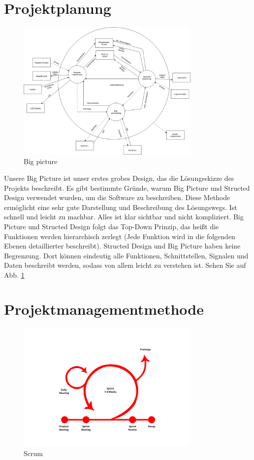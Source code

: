 \section{Projektplanung}
\begin{figure}[H]
	\includegraphics[width=0.8\textwidth]{./figures/Big_Picture.jpg}
	\caption{Big picture}
	\label{fig:bigpicture}
\end{figure}
Unsere Big Picture ist unser erstes grobes Design, das die Lösungsskizze des Projekts beschreibt. Es gibt bestimmte Gründe, warum Big Picture und Structed Design verwendet wurden, um die Software zu beschreiben. Diese Methode ermöglicht eine sehr gute Darstellung und Beschreibung des Lösungswegs. Ist schnell und leicht zu machbar. Alles ist klar sichtbar und nicht kompliziert. Big Picture und Structed Design folgt das Top-Down Prinzip, das heißt die Funktionen werden hierarchisch zerlegt (Jede Funktion wird in die folgenden Ebenen detaillierter beschreibt). Structed Design und Big Picture haben keine Begrenzung. Dort können eindeutig alle Funktionen, Schnittstellen, Signalen und Daten beschreibt werden, sodass von allem leicht zu verstehen ist. Sehen Sie auf Abb. \ref{fig:bigpicture}
	
\section{Projektmanagementmethode}
\begin{figure}[H]
	\includegraphics[width=0.8\textwidth]{./figures/scrum.jpg}
	\caption{Scrum}
	\label{fig:scrum}
\end{figure}

